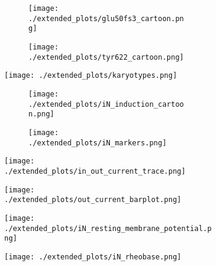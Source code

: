 \begin{figure}[ht]
    \begin{subfigure}[t]{0.3\textwidth}
        \begin{subfigure}[t]{\textwidth}
            \caption{}
            \texttt{[image: ./extended\_plots/glu50fs3\_cartoon.png]}        
        \end{subfigure}    
        \begin{subfigure}[t]{\textwidth}
            \caption{}
            \texttt{[image: ./extended\_plots/tyr622\_cartoon.png]}        
        \end{subfigure}  
    \end{subfigure}  
    \begin{subfigure}[t]{0.2\textwidth}
        \caption{}
        \texttt{[image: ./extended\_plots/karyotypes.png]}        
    \end{subfigure}  
    \begin{subfigure}[t]{0.4\textwidth}
        \begin{subfigure}[t]{\textwidth}
            \caption{}
            \texttt{[image: ./extended\_plots/iN\_induction\_cartoon.png]}        
        \end{subfigure}    
        \begin{subfigure}[t]{\textwidth}
            \caption{}
            \texttt{[image: ./extended\_plots/iN\_markers.png]}        
        \end{subfigure}  
    \end{subfigure}    
    \begin{subfigure}[t]{0.33\textwidth}
        \caption{}
        \texttt{[image: ./extended\_plots/in\_out\_current\_trace.png]}        
    \end{subfigure}  
    \begin{subfigure}[t]{0.33\textwidth}
        \caption{}
        \texttt{[image: ./extended\_plots/out\_current\_barplot.png]}        
    \end{subfigure}  
    \begin{subfigure}[t]{0.25\textwidth}
        \caption{}
        \texttt{[image: ./extended\_plots/iN\_resting\_membrane\_potential.png]}        
    \end{subfigure}  
    \begin{subfigure}[t]{0.25\textwidth}
        \caption{}
        \texttt{[image: ./extended\_plots/iN\_rheobase.png]}        

\end{subfigure}
\end{figure}

